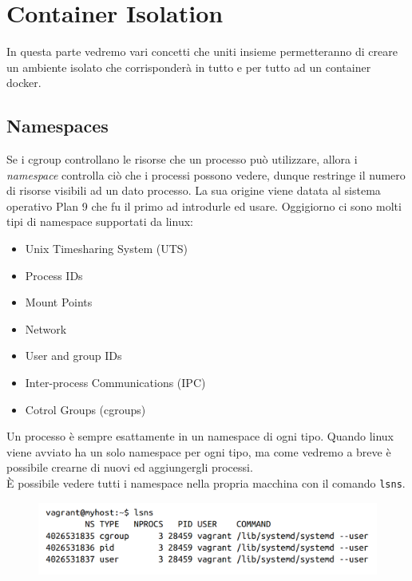 \chapter{Container Isolation}

In questa parte vedremo vari concetti che uniti insieme permetteranno di creare
un ambiente isolato che corrisponderà in tutto e per tutto ad un container docker.

\section{Namespaces}

Se i cgroup controllano le risorse che un processo può utilizzare, allora i
\textit{namespace} controlla ciò che i processi possono vedere, dunque restringe
il numero di risorse visibili ad un dato processo.
La sua origine viene datata al sistema operativo Plan 9 che fu il primo ad
introdurle ed usare.
Oggigiorno ci sono molti tipi di namespace supportati da linux:

\begin{itemize}
    \item Unix Timesharing System (UTS)
    \item Process IDs
    \item Mount Points
    \item Network
    \item User and group IDs
    \item Inter-process Communications (IPC)
    \item Cotrol Groups (cgroups)
\end{itemize}

Un processo è sempre esattamente in un namespace di ogni tipo.
Quando linux viene avviato ha un solo namespace per ogni tipo, ma come vedremo
a breve è possibile crearne di nuovi ed aggiungergli processi.\\

È possibile vedere tutti i namespace nella propria macchina con il comando
\verb|lsns|.

\begin{figure}[H]
    \centering
    \includegraphics[width=\textwidth, keepaspectratio]{capitoli/os_security/imgs/namespace1.png}
\end{figure}

